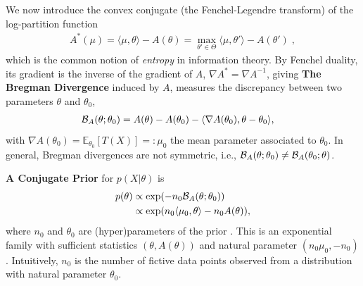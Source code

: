 \documentclass[twoside]{article}
\newcommand*{\expect}[2][]{\ensuremath{\mathbb{E}_{#1} \left[ #2 \right] }} %
\newcommand{\logpart}{A}
\newcommand{\conj}{\logpart^*}
\newcommand{\bregman}{\cB_\logpart}
\newcommand{\bregmanconj}{\cB_{\logpart^*}}
\newcommand{\nat}{\theta}
\newcommand{\m}{\mu}
\newcommand{\meanp}{\m}
\begin{document}
We now introduce the convex conjugate (the Fenchel-Legendre transform) of the log-partition function
\begin{align}
	\conj(\m) =  \langle \m, \nat \rangle - \logpart(\nat)
	=  \max_{\nat'\in\Theta}  \langle \m, \nat' \rangle - \logpart(\nat')\; ,
\end{align}
which is the common notion of \textit{entropy} in information theory.
By Fenchel duality, its gradient is the inverse of the gradient of $\logpart$,  $\nabla\conj=\nabla\logpart^{-1}$, giving
\aligns{
	\nabla\conj \circ \nabla\logpart(\nat) = \nat, \quad \nabla\logpart\circ \nabla\conj(\meanp) = \meanp.
}
%
{\bf The Bregman Divergence} induced by $\logpart$,
measures the discrepancy between two parameters $\nat$ and $\nat_0$,
\begin{align}
    \bregman (\nat ; \nat_0)
    & = \logpart(\nat) - \logpart(\nat_0)
    - \langle \nabla \logpart(\nat_0)  , \nat - \nat_0 \rangle,
    \label{eq:defBregman}
\end{align}
with $\nabla \logpart(\nat_0) = \expect[\nat_0]{T(X)} =: \meanp_0$ the mean parameter associated to $\nat_0$.
In general, Bregman divergences are not symmetric, i.e., $\bregman (\nat ; \nat_0)\neq \bregman (\nat_0 ; \nat)$.

{\bf A Conjugate Prior} for $p(X|\nat)$ is
\begin{align}
    p(\nat)
    &\propto \exp( - n_0 \bregman(\nat ; \nat_0) ) \\
    &\propto \exp(n_0 \langle \m_0, \nat \rangle - n_0 \logpart(\nat)),
    \label{eq:def_prior}
\end{align}
where $n_0$ and $\nat_0$ are (hyper)parameters of the prior  \citep{agarwal2010geometric}.
This is an exponential family with sufficient statistics $(\nat ,\logpart(\nat))$ and natural parameter $(n_0 \m_0, -n_0)$.
Intuitively, $n_0$ is the number of fictive data points observed from a distribution with natural parameter $\nat_0$.
\end{document}
